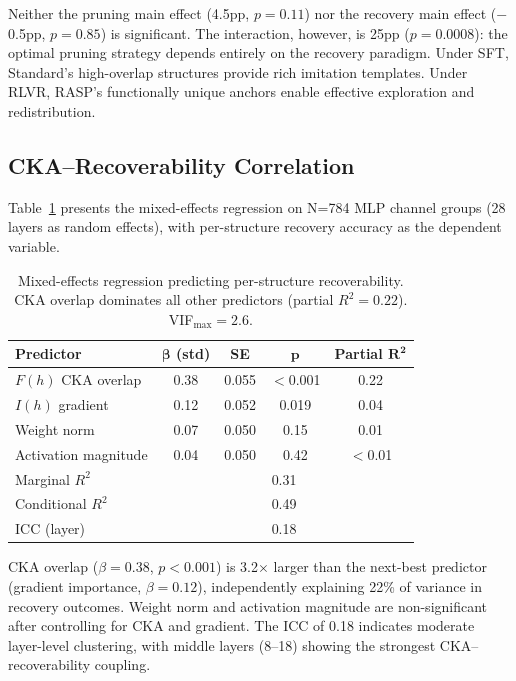 \documentclass[11pt,a4paper]{article}
\newcommand{\method}{RASP}
\newcommand{\importance}{I(h)}
\newcommand{\overlap}{F(h)}
\begin{document}
Neither the pruning main effect (4.5pp, $p = 0.11$) nor the recovery main effect ($-$0.5pp, $p = 0.85$) is significant. The interaction, however, is 25pp ($p = 0.0008$): the optimal pruning strategy depends entirely on the recovery paradigm. Under SFT, Standard's high-overlap structures provide rich imitation templates. Under RLVR, \method{}'s functionally unique anchors enable effective exploration and redistribution.

\subsection{CKA--Recoverability Correlation}
\label{sec:correlation}

Table~\ref{tab:regression} presents the mixed-effects regression on N=784 MLP channel groups (28 layers as random effects), with per-structure recovery accuracy as the dependent variable.

\begin{table}[t]
\centering
\small
\caption{Mixed-effects regression predicting per-structure recoverability. CKA overlap dominates all other predictors (partial $R^2 = 0.22$). VIF$_{\max} = 2.6$.}
\label{tab:regression}
\begin{tabular}{lcccc}
\toprule
\textbf{Predictor} & $\boldsymbol{\beta}$ \textbf{(std)} & \textbf{SE} & $\boldsymbol{p}$ & \textbf{Partial} $\boldsymbol{R^2}$ \\
\midrule
$\overlap{}$ CKA overlap & 0.38 & 0.055 & $<$0.001 & 0.22 \\
$\importance{}$ gradient & 0.12 & 0.052 & 0.019 & 0.04 \\
Weight norm & 0.07 & 0.050 & 0.15 & 0.01 \\
Activation magnitude & 0.04 & 0.050 & 0.42 & $<$0.01 \\
\midrule
Marginal $R^2$ & \multicolumn{4}{c}{0.31} \\
Conditional $R^2$ & \multicolumn{4}{c}{0.49} \\
ICC (layer) & \multicolumn{4}{c}{0.18} \\
\bottomrule
\end{tabular}
\end{table}

CKA overlap ($\beta = 0.38$, $p < 0.001$) is 3.2$\times$ larger than the next-best predictor (gradient importance, $\beta = 0.12$), independently explaining 22\% of variance in recovery outcomes. Weight norm and activation magnitude are non-significant after controlling for CKA and gradient. The ICC of 0.18 indicates moderate layer-level clustering, with middle layers (8--18) showing the strongest CKA--recoverability coupling.
\end{document}
